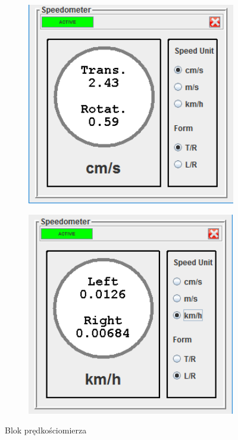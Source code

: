 \documentclass[eng,printmode]{mgr}
\begin{document}
   \begin{figure}[ht]
    \centering
    \begin{subfigure}{.45\textwidth}
     \centering
     \includegraphics[width=1\textwidth]{images/speed1}
     \label{fig:speed1}
    \end{subfigure}
    \begin{subfigure}{.45\textwidth}
     \centering
     \includegraphics[width=1\textwidth]{images/speed2}
     \label{fig:speed2}
    \end{subfigure}
    \caption{Blok prędkościomierza}
    \label{fig:blok_wiz}
   \end{figure}
\end{document}
